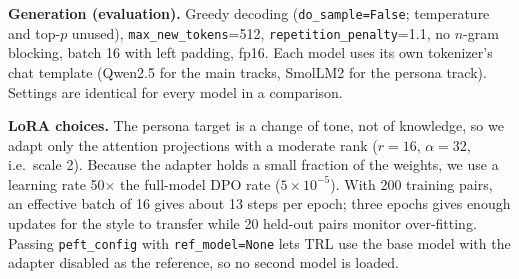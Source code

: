 \documentclass[10pt]{article}
\begin{document}
\textbf{Generation (evaluation).} Greedy decoding (\texttt{do\_sample=False}; temperature and top-$p$
unused), \texttt{max\_new\_tokens}=512, \texttt{repetition\_penalty}=1.1, no $n$-gram blocking,
batch 16 with left padding, fp16. Each model uses its own tokenizer's chat template (Qwen2.5 for the
main tracks, SmolLM2 for the persona track). Settings are identical for every model in a comparison.

\textbf{LoRA choices.} The persona target is a change of tone, not of knowledge, so we adapt only the
attention projections with a moderate rank ($r=16$, $\alpha=32$, i.e.\ scale 2). Because the adapter
holds a small fraction of the weights, we use a learning rate 50$\times$ the full-model DPO rate
($5\times10^{-5}$). With 200 training pairs, an effective batch of 16 gives about 13 steps per epoch;
three epochs gives enough updates for the style to transfer while 20 held-out pairs monitor
over-fitting. Passing \texttt{peft\_config} with \texttt{ref\_model=None} lets TRL use the base model
with the adapter disabled as the reference, so no second model is loaded.

\end{document}
